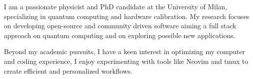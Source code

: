 \documentclass[9pt]{developercv} %
\begin{document}
\vspace{0.5cm} %



I am a passionate physicist and PhD candidate at the University of Milan, 
specializing in quantum computing and hardware calibration.
My research focuses on developing open-source and community driven software aiming
a full stack approach on quantum computing and on exploring possible new applications.  

Beyond my academic pursuits, I have a keen interest in optimizing my computer and
coding experience, I enjoy experimenting with tools like Neovim and tmux to 
create efficient and personalized workflows. 

	
	
\end{document}
